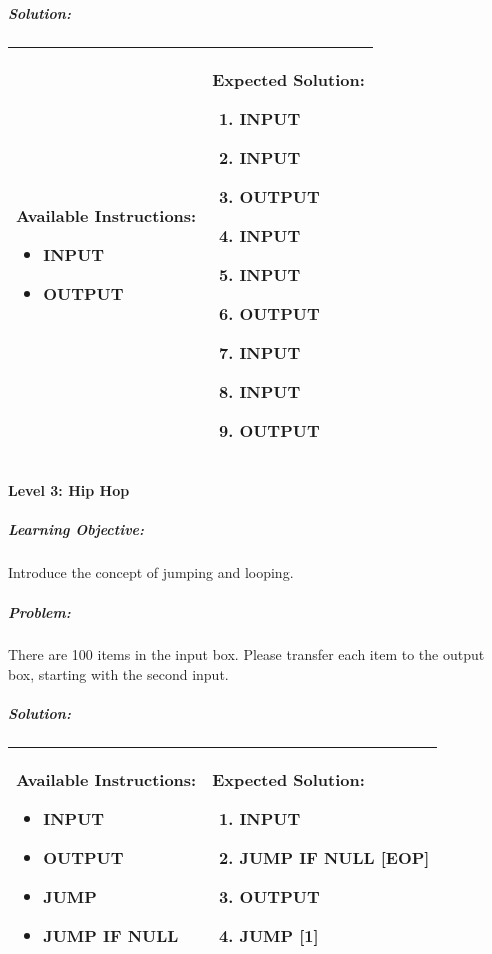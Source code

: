 \subparagraph{Solution:} 
\begin{center}
    \begin{tabular}{ | m{5cm} | m{9cm} | } 
        \hline
            \textbf{Available Instructions:} 
            \begin{itemize}
                \item INPUT
                \item OUTPUT
            \end{itemize}& 
            \textbf{Expected Solution:} 
            \begin{enumerate}
                \item INPUT
                \item INPUT
                \item OUTPUT
                \item INPUT
                \item INPUT
                \item OUTPUT
                \item INPUT
                \item INPUT
                \item OUTPUT
            \end{enumerate}
            \\
        \hline
    \end{tabular}
\end{center}

\paragraph{Level 3: Hip Hop}
\subparagraph{Learning Objective:} Introduce the concept of jumping and looping.

\subparagraph{Problem:} There are 100 items in the input box. Please transfer each item to the output box, starting with the second input.

\subparagraph{Solution:} 
\begin{center}
    \begin{tabular}{ | m{5cm} | m{9cm} | } 
        \hline
            \textbf{Available Instructions:} 
            \begin{itemize}
                \item INPUT
                \item OUTPUT
                \item JUMP
                \item JUMP IF NULL
            \end{itemize}& 
            \textbf{Expected Solution:} 
            \begin{enumerate}
                \item INPUT
                \item JUMP IF NULL [EOP]
                \item OUTPUT
                \item JUMP [1]
            \end{enumerate}
            \\
        \hline
    \end{tabular}
\end{center}

